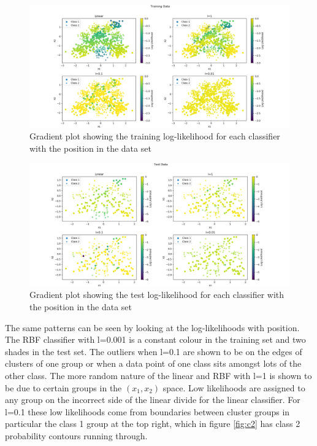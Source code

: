 \documentclass[twoside,twocolumn]{article}
\begin{document}
\begin{figure}[h]
  \centering
    \includegraphics[width=0.83\linewidth]{trainingdatallmap}
  \caption{Gradient plot showing the training log-likelihood for each classifier with the position in the data set}
  \label{fig:lltrainmap}
\end{figure}
\begin{figure}[h]
  \centering
    \includegraphics[width=0.83\linewidth]{testdatallmap}
  \caption{Gradient plot showing the test log-likelihood for each classifier with the position in the data set}
  \label{fig:lltestmap}
\end{figure}

The same patterns can be seen by looking at the log-likelihoods with position. The RBF classifier with l=0.001 is a constant colour in the training set and two shades in the test set. The outliers when l=0.1 are shown to be on the edges of clusters of one group or when a data point of one class sits amongst lots of the other class. The more random nature of the linear and RBF with l=1 is shown to be due to certain groups in the $(x_1,x_2)$ space. Low likelihoods are assigned to any group on the incorrect side of the linear divide for the linear classifier. For l=0.1 these low likelihoods come from boundaries between cluster groups in particular the class 1 group at the top right, which in figure \ref{fig:c2} has class 2 probability contours running through.
\end{document}
